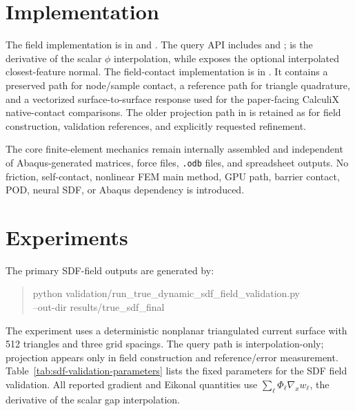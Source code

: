 \documentclass[11pt]{article}
\begin{document}
\section{Implementation}

The field implementation is in  and . The query API includes  and ;  is the derivative of the scalar \(\phi\) interpolation, while  exposes the optional interpolated closest-feature normal. The field-contact implementation is in . It contains a preserved  path for node/sample contact, a reference  path for triangle quadrature, and a vectorized surface-to-surface response used for the paper-facing CalculiX native-contact comparisons. The older projection path in  is retained as  for field construction, validation references, and explicitly requested refinement.

The core finite-element mechanics remain internally assembled and independent of Abaqus-generated matrices, force files, \texttt{.odb} files, and spreadsheet outputs. No friction, self-contact, nonlinear FEM main method, GPU path, barrier contact, POD, neural SDF, or Abaqus dependency is introduced.

\section{Experiments}

The primary SDF-field outputs are generated by:
\begin{quote}
\footnotesize\ttfamily
python validation/run\_true\_dynamic\_sdf\_field\_validation.py\\
--out-dir results/true\_sdf\_final
\end{quote}
The experiment uses a deterministic nonplanar triangulated current surface with 512 triangles and three grid spacings. The query path is interpolation-only; projection appears only in field construction and reference/error measurement. Table~\ref{tab:sdf-validation-parameters} lists the fixed parameters for the SDF field validation. All reported gradient and Eikonal quantities use \(\sum_\ell\Phi_\ell\nabla_x w_\ell\), the derivative of the scalar gap interpolation.
\end{document}
